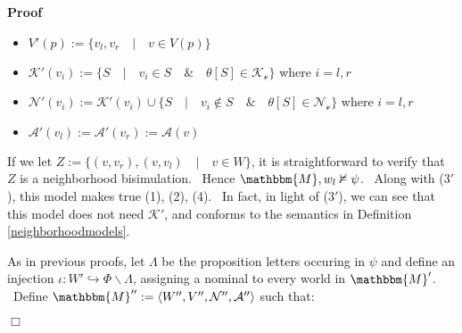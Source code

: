 \documentclass{acmconf}
\newcommand{\assign}{:=}
\newcommand{\nin}{\not\in}
\newenvironment{itemizedot}{\begin{itemize} \renewcommand{\labelitemi}{$\bullet$}\renewcommand{\labelitemii}{$\bullet$}\renewcommand{\labelitemiii}{$\bullet$}\renewcommand{\labelitemiv}{$\bullet$}}{\end{itemize}}
\newenvironment{proof}{\noindent\textbf{Proof\ }}{\hspace*{\fill}$\Box$\medskip}
\begin{document}
\begin{proof}
\begin{itemizedot}
    \item $V' (p) \assign \{v_l, v_r \hspace{1em} | \hspace{1em} v \in V
    (p)\}$
    
    \item $\mathcal{K}' (v_i) \assign \{S \hspace{1em} | \hspace{1em} v_i \in
    S \hspace{1em} \& \hspace{1em} \theta [S] \in \mathcal{K_v} \}$ where $i =
    l, r$
    
    \item $\mathcal{N}' (v_i) \assign \mathcal{K}' (v_i) \cup \{S \hspace{1em}
    | \hspace{1em} v_i \nin S \hspace{1em} \& \hspace{1em} \theta [S] \in
    \mathcal{N_v} \}$ where $i = l, r$
    
    \item $\mathcal{A}' (v_l) \assign \mathcal{A}' (v_r) \assign \mathcal{A}
    (v)$
  \end{itemizedot}
  
  
  If we let $Z \assign \{(v, v_r), (v, v_l) \hspace{1em} | \hspace{1em} v \in
  W\}$, it is straightforward to verify that $Z$ is a neighborhood
  bisimulation. \ Hence $\mathbbm{M}, w_l \nvDash \psi$. \ Along with (3$'$),
  this model makes true (1), (2), (4). \ In fact, in light of ($3'$), we can
  see that this model does not need $\mathcal{K}'$, and conforms to the
  semantics in Definition \ref{neighborhoodmodels}.{\hspace*{\fill}}
  
  
  
  As in previous proofs, let $\Lambda$ be the proposition letters occuring in
  $\psi$ and define an injection $\iota : W' \hookrightarrow \Phi \backslash
  \Lambda$, assigning a nominal to every world in $\mathbbm{M}'$. \ Define
  $\mathbbm{M}'' \assign \langle W'', V'', \mathcal{N}'', \mathcal{A}''
  \rangle$ such that:
  
  
  

\end{proof}
\end{document}
